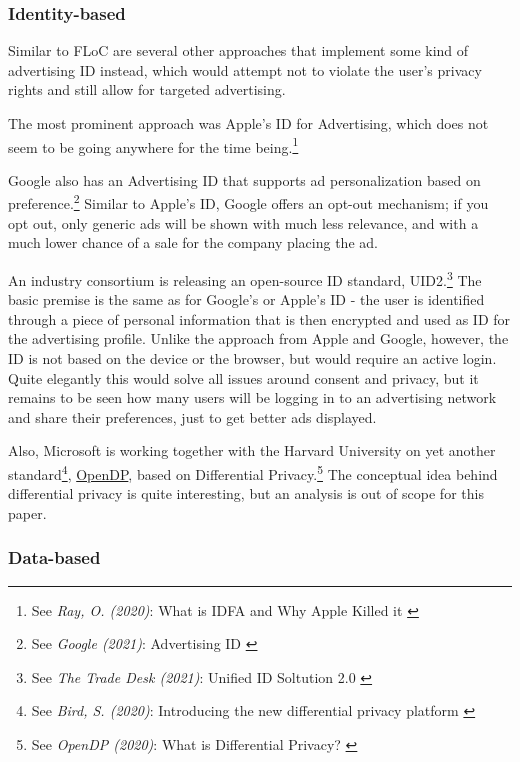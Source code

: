 \subsubsection{Identity-based}

Similar to FLoC are several other approaches that implement some kind of advertising ID instead, which would attempt not to violate the user's privacy rights and still allow for targeted advertising. 

The most prominent approach was Apple's ID for Advertising, which does not seem to be going anywhere for the time being.\footnote{See \textit{Ray, O. (2020)}: What is IDFA and Why Apple Killed it \cite{cleanRoom}}

Google also has an Advertising ID that supports ad personalization based on preference.\footnote{See \textit{Google (2021)}: Advertising ID \cite{advertisingId}} Similar to Apple's ID, Google offers an opt-out mechanism; if you opt out, only generic ads will be shown with much less relevance, and with a much lower chance of a sale for the company placing the ad.

An industry consortium is releasing an open-source ID standard, UID2.\footnote{See \textit{The Trade Desk (2021)}: Unified ID Soltution 2.0 \cite{tradeDesk}} The basic premise is the same as for Google's or Apple's ID - the user is identified through a piece of personal information that is then encrypted and used as ID for the advertising profile. Unlike the approach from Apple and Google, however, the ID is not based on the device or the browser, but would require an active login. Quite elegantly this would solve all issues around consent and privacy, but it remains to be seen how many users will be logging in to an advertising network and share their preferences, just to get better ads displayed.

Also, Microsoft is working together with the Harvard University on yet another standard\footnote{See \textit{Bird, S. (2020)}: Introducing the new differential privacy platform \cite{openDp}}, \href{https://opendp.org/}{OpenDP}, based on Differential Privacy.\footnote{See \textit{OpenDP (2020)}: What is Differential Privacy? \cite{diffPrivacy}} The conceptual idea behind differential privacy is quite interesting, but an analysis is out of scope for this paper.

\subsubsection{Data-based}

